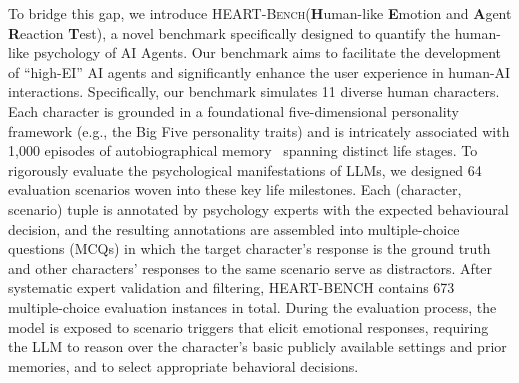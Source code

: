 \documentclass{article}
\newcommand{\ourbench}[0]{\textsc{HEART-Bench}\xspace}
\begin{document}
To bridge this gap, we introduce \ourbench (\textbf{H}uman-like \textbf{E}motion and \textbf{A}gent \textbf{R}eaction \textbf{T}est), a novel benchmark specifically designed to quantify the human-like psychology of AI Agents. Our benchmark aims to facilitate the development of ``high-EI'' AI agents and significantly enhance the user experience in human-AI interactions.
Specifically, our benchmark simulates 11 diverse human characters. Each character is grounded in a foundational five-dimensional personality framework (e.g., the Big Five personality traits) and is intricately associated with 1,000 episodes of autobiographical memory~\cite{singer1995seeing} spanning distinct life stages. To rigorously evaluate the psychological manifestations of LLMs, we designed 64 evaluation scenarios woven into these key life milestones. Each (character, scenario) tuple is annotated by psychology experts with the expected behavioural decision, and the resulting annotations are assembled into multiple-choice questions (MCQs) in which the target character's response is the ground truth and other characters' responses to the same scenario serve as distractors. After systematic expert validation and filtering, HEART-BENCH contains 673 multiple-choice evaluation instances in total. During the evaluation process, the model is exposed to scenario triggers that elicit emotional responses, requiring the LLM to reason over the character’s basic publicly available settings and prior memories, and to select appropriate behavioral decisions.
\end{document}
